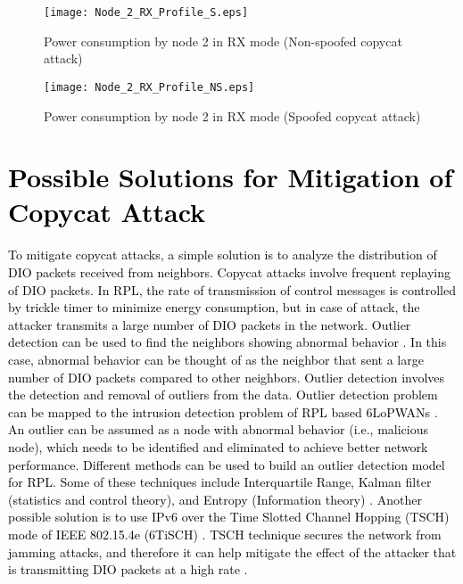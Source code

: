 \documentclass[]{svjour3}                     %
\begin{document}
\begin{figure}[!h]
	\centering
	\texttt{[image: Node\_2\_RX\_Profile\_S.eps]}
	\caption{Power consumption by node 2 in RX mode (Non-spoofed copycat attack)}
	\label{Node_2_RX_Profile_S}
\end{figure}

\begin{figure}[!h]
	\centering
	\texttt{[image: Node\_2\_RX\_Profile\_NS.eps]}
	\caption{Power consumption by node 2 in RX mode (Spoofed copycat attack)}
	\label{Node_2_RX_Profile_NS}
\end{figure}


\section{\textcolor{black}{Possible Solutions for Mitigation of Copycat Attack}}\label{PossibleSol}
\textcolor{black}{To mitigate copycat attacks, a simple solution is to analyze the distribution of DIO packets received from neighbors. Copycat attacks involve frequent replaying of DIO packets. In RPL, the rate of transmission of control messages is controlled by trickle timer to minimize energy consumption, but in case of attack, the attacker transmits a large number of DIO packets in the network. Outlier detection can be used to find the neighbors showing abnormal behavior \cite{barnett1974outliers,verma2019addressing,vermacosec}. In this case, abnormal behavior can be thought of as the neighbor that sent a large number of DIO packets compared to other neighbors. Outlier detection involves the detection and removal of outliers from the data. Outlier detection problem can be mapped to the intrusion detection problem of RPL based 6LoPWANs \cite{kumar2016anomaly,jabez2015intrusion}. An outlier can be assumed as a node with abnormal behavior (i.e., malicious node), which needs to be identified and eliminated to achieve better network performance. Different methods can be used to build an outlier detection model for RPL. Some of these techniques include Interquartile Range, Kalman filter (statistics and control theory), and Entropy (Information theory) \cite{wang2018robust, domingues2018comparative,zhi2018gini}. Another possible solution is to use IPv6 over the Time Slotted Channel Hopping (TSCH) mode of IEEE 802.15.4e (6TiSCH) \cite{dujovne20146tisch}. TSCH technique secures the network from jamming attacks, and therefore it can help mitigate the effect of the attacker that is transmitting DIO packets at a high rate \cite{zorbas2018r}. } 
\end{document}
